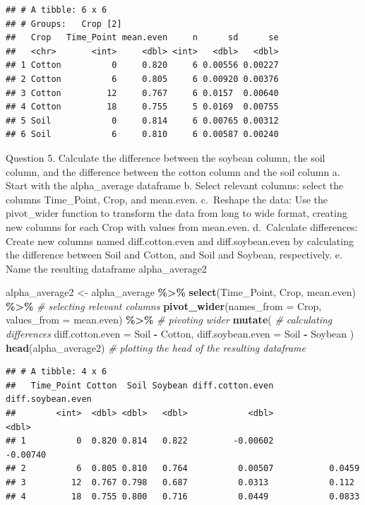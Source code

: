 \documentclass[
]{article}
\newenvironment{Shaded}{\begin{snugshade}}{\end{snugshade}}
\newcommand{\AttributeTok}[1]{\textcolor[rgb]{0.13,0.29,0.53}{#1}}
\newcommand{\CommentTok}[1]{\textcolor[rgb]{0.56,0.35,0.01}{\textit{#1}}}
\newcommand{\FunctionTok}[1]{\textcolor[rgb]{0.13,0.29,0.53}{\textbf{#1}}}
\newcommand{\NormalTok}[1]{#1}
\newcommand{\OtherTok}[1]{\textcolor[rgb]{0.56,0.35,0.01}{#1}}
\newcommand{\SpecialCharTok}[1]{\textcolor[rgb]{0.81,0.36,0.00}{\textbf{#1}}}
\begin{document}
\begin{verbatim}
## # A tibble: 6 x 6
## # Groups:   Crop [2]
##   Crop   Time_Point mean.even     n      sd      se
##   <chr>       <int>     <dbl> <int>   <dbl>   <dbl>
## 1 Cotton          0     0.820     6 0.00556 0.00227
## 2 Cotton          6     0.805     6 0.00920 0.00376
## 3 Cotton         12     0.767     6 0.0157  0.00640
## 4 Cotton         18     0.755     5 0.0169  0.00755
## 5 Soil            0     0.814     6 0.00765 0.00312
## 6 Soil            6     0.810     6 0.00587 0.00240
\end{verbatim}

Question 5. Calculate the difference between the soybean column, the
soil column, and the difference between the cotton column and the soil
column a. Start with the alpha\_average dataframe b. Select relevant
columns: select the columns Time\_Point, Crop, and mean.even. c.~Reshape
the data: Use the pivot\_wider function to transform the data from long
to wide format, creating new columns for each Crop with values from
mean.even. d.~Calculate differences: Create new columns named
diff.cotton.even and diff.soybean.even by calculating the difference
between Soil and Cotton, and Soil and Soybean, respectively. e. Name the
resulting dataframe alpha\_average2

\begin{Shaded}
\begin{Highlighting}[]
\NormalTok{alpha\_average2 }\OtherTok{\textless{}{-}}\NormalTok{ alpha\_average }\SpecialCharTok{\%\textgreater{}\%}
  \FunctionTok{select}\NormalTok{(Time\_Point, Crop, mean.even) }\SpecialCharTok{\%\textgreater{}\%}   \CommentTok{\# selecting relevant columns}
  \FunctionTok{pivot\_wider}\NormalTok{(}\AttributeTok{names\_from =}\NormalTok{ Crop, }\AttributeTok{values\_from =}\NormalTok{ mean.even) }\SpecialCharTok{\%\textgreater{}\%}   \CommentTok{\# pivoting wider}
  \FunctionTok{mutate}\NormalTok{(                                   }\CommentTok{\# calculating differences}
    \AttributeTok{diff.cotton.even =}\NormalTok{ Soil }\SpecialCharTok{{-}}\NormalTok{ Cotton,}
    \AttributeTok{diff.soybean.even =}\NormalTok{ Soil }\SpecialCharTok{{-}}\NormalTok{ Soybean}
\NormalTok{  )}
\FunctionTok{head}\NormalTok{(alpha\_average2)                }\CommentTok{\# plotting the head of the resulting dataframe}
\end{Highlighting}
\end{Shaded}

\begin{verbatim}
## # A tibble: 4 x 6
##   Time_Point Cotton  Soil Soybean diff.cotton.even diff.soybean.even
##        <int>  <dbl> <dbl>   <dbl>            <dbl>             <dbl>
## 1          0  0.820 0.814   0.822         -0.00602          -0.00740
## 2          6  0.805 0.810   0.764          0.00507           0.0459 
## 3         12  0.767 0.798   0.687          0.0313            0.112  
## 4         18  0.755 0.800   0.716          0.0449            0.0833
\end{verbatim}
\end{document}
